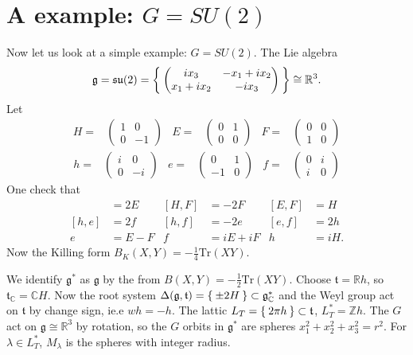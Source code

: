 \documentclass[11pt]{amsart}
\def\bC{{\mathbb{C}}}
\def\bR{{\mathbb{R}}}
\def\bZ{{\mathbb{Z}}}
\def\fgg{{\mathfrak{g}}}
\def\ftt{{\mathfrak{t}}}
\def\bZ{{\mathbb{Z}}}
\def\Tr{\mathrm{Tr}}
\begin{document}
\section{A example: $G = SU(2)$}
Now let us look at a simple example: $G=SU(2)$.
The Lie algebra 
\[
\fgg  = \mathfrak{su}(2) = 
\Set{\begin{pmatrix}
ix_3 & -x_1+ix_2\\
x_1+ix_2& -ix_3
\end{pmatrix}
}\cong \bR^3.
\] 
Let
\begin{align*}
H =& \begin{pmatrix}
1 & 0\\
0 & -1
\end{pmatrix} &
E =& \begin{pmatrix}
0 & 1\\
0 & 0
\end{pmatrix} &
F =& \begin{pmatrix}
0 & 0\\
1 & 0
\end{pmatrix}
\end{align*}
\begin{align*}
h =& \begin{pmatrix}
i & 0\\
0 & -i
\end{pmatrix} &
e =& \begin{pmatrix}
0 & 1\\
-1 & 0
\end{pmatrix} &
f =& \begin{pmatrix}
0 & i\\
i & 0
\end{pmatrix}
\end{align*}
One check that 
\begin{align*}
[H,E] &= 2E& [H,F] &= -2F& [E,F] &= H\\ 
[h,e] &= 2 f & [h,f] &= -2e &[e,f] &= 2h\\
e &= E -F& f &= iE+iF & h& = iH.
\end{align*}
Now the Killing form $B_K(X,Y) = -\frac{1}{4}\Tr(XY)$.

We identify $\fgg^*$ as $\fgg$ by the from 
$B(X,Y) = -\frac{1}{2}\Tr(XY)$.
Choose $\ftt = \bR h$, so $\ftt_\bC = \bC H$. 
Now the root system $\Delta(\fgg,\ftt) = \Set{\pm 2 H} \subset \fgg_\bC^* $
and the Weyl group act on $\ftt$ by change sign, ie.e $wh = -h$.
The lattic $L_T = \Set{2\pi h} \subset \ftt$, $L_T^* = \bZ h$.
The $G$ act on $\fgg\cong \bR^3$ by rotation, so the $G$ orbits in $\fgg^*$ 
are spheres $x_1^2+x_2^2+x_3^2=r^2$. For $\lambda \in L_T^*$, $M_\lambda$ is the
spheres with integer radius. 






\end{document}
